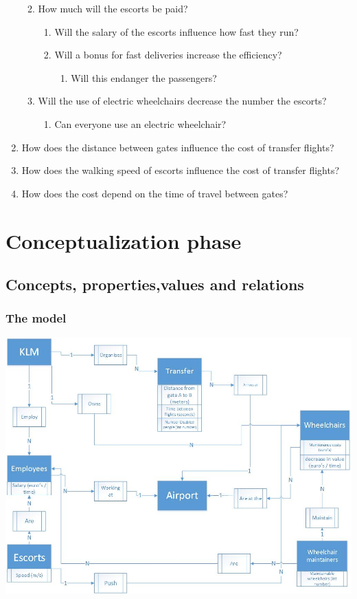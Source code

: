 \documentclass[a4paper, 11pt, notitlepage]{report}
\begin{document}
\begin{enumerate}
\begin{enumerate}
\begin{enumerate}
		\end{enumerate}
	\item How much will the escorts be paid?
		\begin{enumerate}
		\item Will the salary of the escorts influence how fast they run?
		\item Will a bonus for fast deliveries increase the efficiency?
			\begin{enumerate}
			\item Will this endanger the passengers?
			\end{enumerate}
		\end{enumerate}
	\item Will the use of electric wheelchairs decrease the number the escorts?
		\begin{enumerate}
			\item Can everyone use an electric wheelchair?
		\end{enumerate}
	\end{enumerate}
		
\item How does the distance between gates influence the cost of transfer flights?
\item How does the walking speed of escorts influence the cost of transfer flights?
\item How does the cost depend on the time of travel between gates?
\end{enumerate}
\clearpage


\chapter{Conceptualization phase}
\section{Concepts, properties,values and relations}

\subsection{The model}
\includegraphics[scale=0.5]{figures/Conceptualmodel.jpg}
\clearpage
\end{document}
